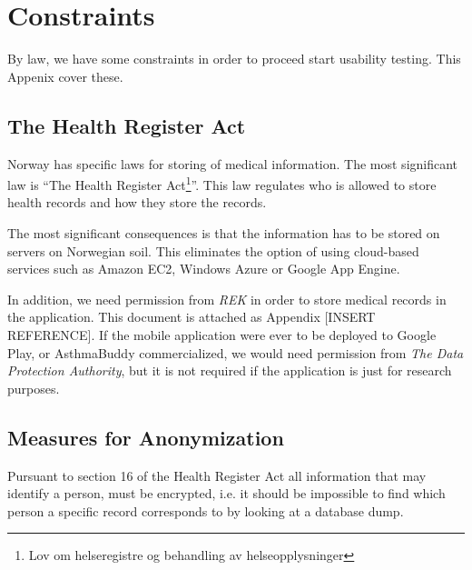 
\chapter{Constraints}
\label{chp:securityrequirements}

By law, we have some constraints in order to proceed start usability testing. This Appenix cover these. 

\section{The Health Register Act}
\label{sec:helseregisterloven}

Norway has specific laws for storing of medical information. The most significant law is ``The Health Register Act\footnote{Lov om helseregistre og behandling av helseopplysninger}''\cite{helseregisterloven}. This law regulates who is allowed to store health records and how they store the records. 

The most significant consequences is that the information has to be stored on servers on Norwegian soil. This eliminates the option of using cloud-based services such as Amazon EC2, Windows Azure or Google App Engine. 

In addition, we need permission from \emph{REK}  in order to store medical records in the application. This document is attached as Appendix [INSERT REFERENCE]. If the mobile application were ever to be deployed to Google Play, or AsthmaBuddy commercialized, we would need permission from \emph{The Data Protection Authority}, but it is not required if the application is just for research purposes. 

\section{Measures for Anonymization}
Pursuant to section 16 of the Health Register Act \cite{helseregisterloven} all information that may identify a person, must be encrypted, i.e. it should be impossible to find which person a specific record corresponds to by looking at a database dump.  